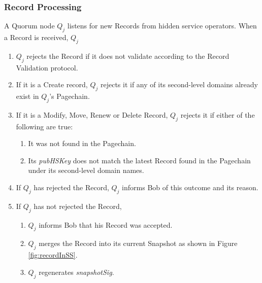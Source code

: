 \subsubsection{Record Processing}

A Quorum node $ Q_{j} $ listens for new Records from hidden service operators. When a Record is received, $ Q_{j} $

\begin{enumerate}
	\item $ Q_{j} $ rejects the Record if it does not validate according to the Record Validation protocol.
	\item If it is a Create record, $ Q_{j} $ rejects it if any of its second-level domains already exist in $ Q_{j} $'s Pagechain.
	\item If it is a Modify, Move, Renew or Delete Record, $ Q_{j} $ rejects it if either of the following are true:
		\begin{enumerate}
			\item It was not found in the Pagechain.
			\item Its \emph{pubHSKey} does not match the latest Record found in the Pagechain under its second-level domain names.
		\end{enumerate}
	\item If $ Q_{j} $ has rejected the Record, $ Q_{j} $ informs Bob of this outcome and its reason.
	\item If $ Q_{j} $ has not rejected the Record,
		\begin{enumerate}
			\item $ Q_{j} $ informs Bob that his Record was accepted.
			\item $ Q_{j} $ merges the Record into its current Snapshot as shown in Figure \ref{fig:recordInSS}.
			\item $ Q_{j} $ regenerates \emph{snapshotSig}.
		\end{enumerate}
\end{enumerate}


